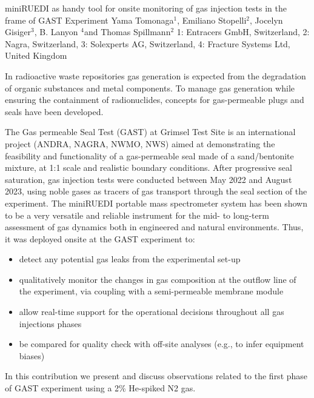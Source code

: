 \begin{conf-abstract}
{miniRUEDI as handy tool for onsite monitoring of gas injection tests in the frame of GAST Experiment}
{Yama Tomonaga$^1$, Emiliano Stopelli$^2$, Jocelyn Gisiger$^3$, B. Lanyon $^4$and Thomas Spillmann$^2$}
{1: Entracers GmbH, Switzerland, 2: Nagra, Switzerland, 3: Solexperts AG, Switzerland, 4: Fracture Systems Ltd, United Kingdom}
{In radioactive waste repositories gas generation is expected from the degradation of organic substances and metal components. To manage gas generation while ensuring the containment of radionuclides, concepts for gas-permeable plugs and seals have been developed.

The Gas permeable Seal Test (GAST) at Grimsel Test Site is an international project (ANDRA, NAGRA, NWMO, NWS) aimed at demonstrating the feasibility and functionality of a gas-permeable seal made of a sand/bentonite mixture, at 1:1 scale and realistic boundary conditions. After progressive seal saturation, gas injection tests were conducted between May 2022 and August 2023, using noble gases as tracers of gas transport through the seal section of the experiment.
The miniRUEDI portable mass spectrometer system has been shown to be a very versatile and reliable instrument for the mid- to long-term assessment of gas dynamics both in engineered and natural environments. Thus, it was deployed onsite at the GAST experiment to:
\begin{itemize}
\item detect any potential gas leaks from the experimental set-up
\item qualitatively monitor the changes in gas composition at the outflow line of the experiment, via coupling with a semi-permeable membrane module
\item allow real-time support for the operational decisions throughout all gas injections phases 
\item be compared for quality check with off-site analyses (e.g., to infer equipment biases)
\end{itemize}
In this contribution we present and discuss observations related to the first phase of GAST experiment using a 2\% He-spiked N2 gas.}
\end{conf-abstract}



